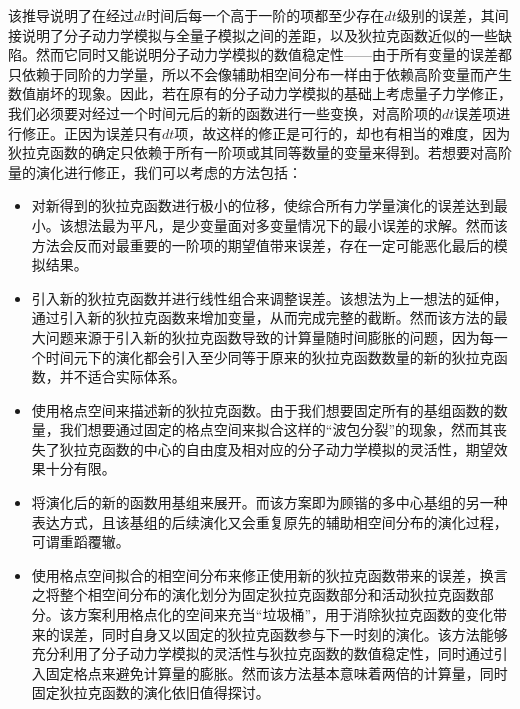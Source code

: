 该推导说明了在经过$dt$时间后每一个高于一阶的项都至少存在$dt$级别的误差，其间接说明了分子动力学模拟与全量子模拟之间的差距，以及狄拉克函数近似的一些缺陷。然而它同时又能说明分子动力学模拟的数值稳定性——由于所有变量的误差都只依赖于同阶的力学量，所以不会像辅助相空间分布一样由于依赖高阶变量而产生数值崩坏的现象。因此，若在原有的分子动力学模拟的基础上考虑量子力学修正，我们必须要对经过一个时间元后的新的函数进行一些变换，对高阶项的$dt$误差项进行修正。正因为误差只有$dt$项，故这样的修正是可行的，却也有相当的难度，因为狄拉克函数的确定只依赖于所有一阶项或其同等数量的变量来得到。若想要对高阶量的演化进行修正，我们可以考虑的方法包括：
\begin{itemize}
	\item 对新得到的狄拉克函数进行极小的位移，使综合所有力学量演化的误差达到最小。该想法最为平凡，是少变量面对多变量情况下的最小误差的求解。然而该方法会反而对最重要的一阶项的期望值带来误差，存在一定可能恶化最后的模拟结果。
	\item 引入新的狄拉克函数并进行线性组合来调整误差。该想法为上一想法的延伸，通过引入新的狄拉克函数来增加变量，从而完成完整的截断。然而该方法的最大问题来源于引入新的狄拉克函数导致的计算量随时间膨胀的问题，因为每一个时间元下的演化都会引入至少同等于原来的狄拉克函数数量的新的狄拉克函数，并不适合实际体系。
	\item 使用格点空间来描述新的狄拉克函数。由于我们想要固定所有的基组函数的数量，我们想要通过固定的格点空间来拟合这样的``波包分裂''的现象，然而其丧失了狄拉克函数的中心的自由度及相对应的分子动力学模拟的灵活性，期望效果十分有限。
	\item 将演化后的新的函数用基组来展开。而该方案即为顾锴的多中心基组的另一种表达方式，且该基组的后续演化又会重复原先的辅助相空间分布的演化过程，可谓重蹈覆辙。
	\item 使用格点空间拟合的相空间分布来修正使用新的狄拉克函数带来的误差，换言之将整个相空间分布的演化划分为固定狄拉克函数部分和活动狄拉克函数部分。该方案利用格点化的空间来充当``垃圾桶''，用于消除狄拉克函数的变化带来的误差，同时自身又以固定的狄拉克函数参与下一时刻的演化。该方法能够充分利用了分子动力学模拟的灵活性与狄拉克函数的数值稳定性，同时通过引入固定格点来避免计算量的膨胀。然而该方法基本意味着两倍的计算量，同时固定狄拉克函数的演化依旧值得探讨。
\end{itemize}